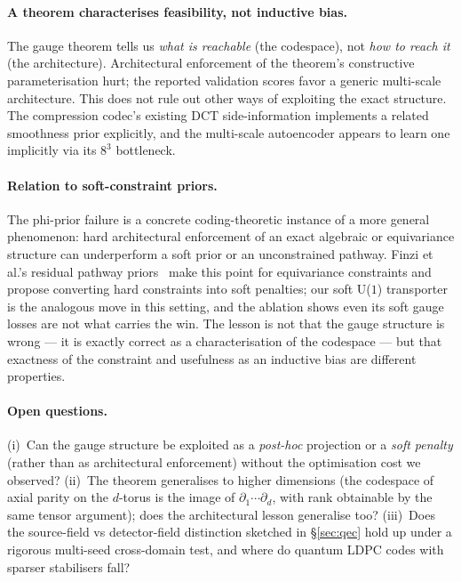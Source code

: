 \documentclass[11pt,a4paper]{article}
\begin{document}
\paragraph{A theorem characterises feasibility, not inductive bias.}
The gauge theorem tells us \emph{what is reachable} (the codespace),
not \emph{how to reach it} (the architecture). Architectural
enforcement of the theorem's constructive parameterisation hurt; the
reported validation scores favor a generic multi-scale architecture.
This does not rule out other ways of exploiting the exact structure. The
compression codec's existing DCT side-information implements a related
smoothness prior explicitly, and the multi-scale autoencoder appears to
learn one implicitly via its $8^3$ bottleneck.

\paragraph{Relation to soft-constraint priors.}
The phi-prior failure is a concrete coding-theoretic instance of a more
general phenomenon: hard architectural enforcement of an exact
algebraic or equivariance structure can underperform a soft prior or an
unconstrained pathway. Finzi et al.'s residual pathway
priors~\cite{finzi2021rpp} make this point for equivariance constraints
and propose converting hard constraints into soft penalties; our soft
U($1$) transporter is the analogous move in this setting, and the
ablation shows even its soft gauge losses are not what carries the win.
The lesson is not that the gauge structure is wrong --- it is exactly
correct as a characterisation of the codespace --- but that exactness
of the constraint and usefulness as an inductive bias are different
properties.

\paragraph{Open questions.}
(i)~Can the gauge structure be exploited as a \emph{post-hoc}
projection or a \emph{soft penalty} (rather than as architectural
enforcement) without the optimisation cost we observed?
(ii)~The theorem generalises to higher dimensions (the codespace of
axial parity on the $d$-torus is the image of $\partial_1 \cdots
\partial_d$, with rank obtainable by the same tensor argument); does the
architectural lesson generalise too? (iii)~Does the
source-field vs detector-field distinction sketched in
\S\ref{sec:qec} hold up under a rigorous multi-seed cross-domain test,
and where do quantum LDPC codes with sparser stabilisers fall?
\end{document}
